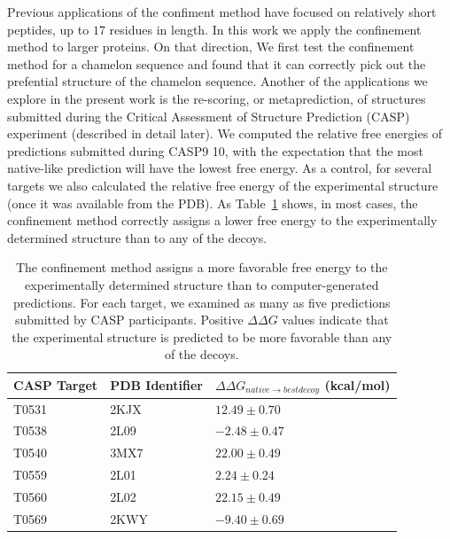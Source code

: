 \documentclass[12pt]{article}
\begin{document}
Previous applications of the confiment method have focused on relatively short peptides, up to $17$
residues in length. In this work we apply the confinement method to
larger proteins. On that direction, We first test the confinement method for a chamelon sequence and 
found that it can correctly pick out the prefential structure of the chamelon sequence. Another of the 
applications we explore in the present work is the re-scoring, or
metaprediction, of structures submitted during the Critical Assessment of Structure Prediction
(CASP) experiment (described in detail later). We computed the relative free energies of predictions
submitted during CASP9 10, with the expectation that the most native-like prediction will have
the lowest free energy. As a control, for several targets we also calculated the relative free
energy of the experimental structure (once it was available from the PDB). As
Table~\ref{table:casp_control} shows, in most cases, the confinement method correctly assigns a
lower free energy to the experimentally determined structure than to any of the decoys. 

\begin{table}
\label{table:casp_control}
\begin{center}
\begin{tabular}{l l l}\hline
    CASP Target  & PDB Identifier & $\Delta\Delta G_{native \to best decoy}$ (kcal/mol) \\ \hline
     T0531       &    2KJX        &          $12.49 \pm 0.70$ \\ \hline
     T0538       &    2L09        &          $-2.48 \pm 0.47$ \\ \hline
     T0540       &    3MX7        &          $22.00 \pm 0.49$ \\ \hline
     T0559       &    2L01        &          $2.24 \pm 0.24$ \\ \hline
     T0560       &    2L02        &          $22.15 \pm 0.49$ \\ \hline
     T0569       &    2KWY        &          $-9.40 \pm 0.69$  \\ \hline
\end{tabular}
\end{center}
\caption{The confinement method assigns a more favorable free energy to the experimentally
determined structure than to computer-generated predictions. For each target, we examined as many as
five predictions submitted by CASP participants. Positive $\Delta\Delta G$ values indicate that the
experimental structure is predicted to be more favorable than any of the decoys.}

\end{table}
\end{document}
